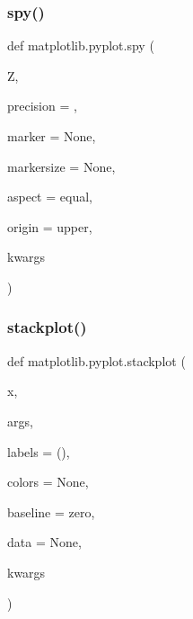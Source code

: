 \subsubsection{\texorpdfstring{spy()}{spy()}}
{\footnotesize\ttfamily def matplotlib.\+pyplot.\+spy (\begin{DoxyParamCaption}\item[{}]{Z,  }\item[{}]{precision = {},  }\item[{}]{marker = {\ttfamily None},  }\item[{}]{markersize = {\ttfamily None},  }\item[{}]{aspect = {\ttfamily \textquotesingle{}equal\textquotesingle{}},  }\item[{}]{origin = {\ttfamily \textquotesingle{}upper\textquotesingle{}},  }\item[{}]{kwargs }\end{DoxyParamCaption})}

\mbox{\label{namespacematplotlib_1_1pyplot_a08dd04b6abdd5a029f77ef143a962e30}} 
\subsubsection{\texorpdfstring{stackplot()}{stackplot()}}
{\footnotesize\ttfamily def matplotlib.\+pyplot.\+stackplot (\begin{DoxyParamCaption}\item[{}]{x,  }\item[{}]{args,  }\item[{}]{labels = {\ttfamily ()},  }\item[{}]{colors = {\ttfamily None},  }\item[{}]{baseline = {\ttfamily \textquotesingle{}zero\textquotesingle{}},  }\item[{}]{data = {\ttfamily None},  }\item[{}]{kwargs }\end{DoxyParamCaption})}

\mbox{\label{namespacematplotlib_1_1pyplot_a32afbd47945f2253e11f54eb9a539cb1}} 
